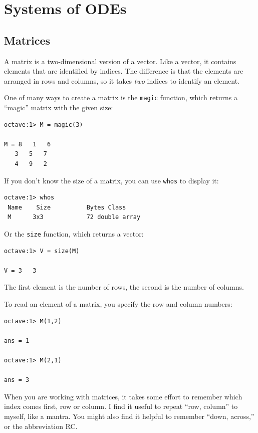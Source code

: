 
\chapter{Systems of ODEs}

\section{Matrices}

A matrix is a two-dimensional version of a vector. Like a vector,
it contains elements that are identified by indices. The difference
is that the elements are arranged in rows and columns, so it takes
{\em two} indices to identify an element.

One of many ways to create a matrix is the {\tt magic} function,
which returns a ``magic'' matrix with the given size:

\begin{verbatim}
octave:1> M = magic(3)

M = 8   1   6
   3   5   7
   4   9   2
\end{verbatim}

If you don't know the size of a matrix, you can use {\tt whos} to
display it:

\begin{verbatim}
octave:1> whos
 Name    Size          Bytes Class
 M      3x3            72 double array
\end{verbatim}

Or the {\tt size} function, which returns a vector:

\begin{verbatim}
octave:1> V = size(M)

V = 3   3
\end{verbatim}

The first element is the number of rows, the second is the number of
columns.

To read an element of a matrix, you specify the row and column numbers:

\begin{verbatim}
octave:1> M(1,2)

ans = 1

octave:1> M(2,1)

ans = 3
\end{verbatim}

When you are working with matrices, it takes some effort to remember
which index comes first, row or column. I find it useful to repeat
``row, column'' to myself, like a mantra. You might also find it
helpful to remember ``down, across,'' or the abbreviation RC.


